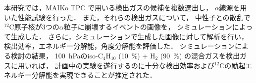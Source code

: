 \documentclass[./master]{subfiles}
\begin{document}
  本研究では，MAIKo TPC で用いる検出ガスの候補を複数選出し，
  $\alpha$線源を用いた性能試験を行った．
  また，それらの検出ガスについて，
  中性子との散乱で${}^{12}\mathrm{C}$原子核が3つの$\alpha$粒子に崩壊するイベントの画像を，
  シミュレーションによって生成した．
  さらに，シミュレーションで生成した画像に対して解析を行い，
  検出効率，エネルギー分解能，角度分解能を評価した．
  シミュレーションによる検討の結果，
  \SI{100}{\hecto\pascal}のiso-$\mathrm{C}_{4}\mathrm{H}_{10}$ (\SI{10}{\percent}) +
  $\mathrm{H}_{2}$ (\SI{90}{\percent}) の混合ガスを検出ガスに用いれば，
  計画中の実験を遂行するのに十分な検出効率および${}^{12}\mathrm{C}$の励起エネルギー分解能を実現できることが推定された．
\end{document}
